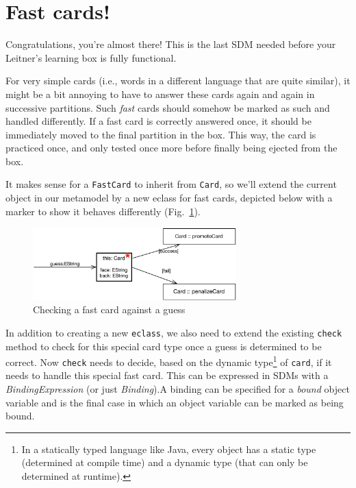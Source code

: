 \newpage
\section{Fast cards!}
\genHeader
\hypertarget{sec:fastCard}{}

Congratulations, you're almost there! This is the last SDM needed before your Leitner's learning box is fully functional.

For very simple cards (i.e., words in a different language that are quite similar), it might be a bit annoying to have to answer these cards again and
again in successive partitions. Such \emph{fast} cards should somehow be marked as such and handled differently. If a fast card is correctly answered once,
it should be immediately moved to the final partition in the box. This way, the card is practiced once, and only tested once more before finally being ejected from the
box.

It makes sense for a \texttt{FastCard} to inherit from \texttt{Card}, so we'll extend the current object in our metamodel by a new eclass for fast cards, 
depicted below with a marker to show it behaves differently (Fig.~\ref{fig:goal_fastCard}).

\begin{figure}[htbp]
	\centering
    \includegraphics[width=0.7\textwidth]{goal_fastCard}
	\caption{Checking a fast card against a guess}
	\label{fig:goal_fastCard}
\end{figure}
\FloatBarrier

In addition to creating a new \texttt{eclass}, we also need to extend the existing \texttt{check} method to check for this special card type once a guess is
determined to be correct. Now \texttt{check} needs to decide, based on the dynamic type\footnote{In a statically typed language like Java, every
object has a static type (determined at compile time) and a dynamic type (that can only be determined at runtime).} of \texttt{card}, if it needs to handle this special fast card. This
can be expressed in SDMs with a \emph{BindingExpression} (or just \emph{Binding}).A binding can be specified for a \emph{bound} object variable
and is the final case in which an object variable can be marked as being bound.

